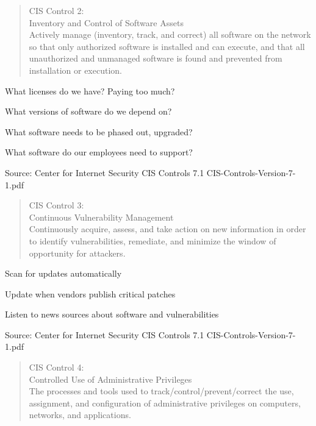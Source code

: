 \documentclass[Screen16to9,17pt]{foils}
\begin{document}

\begin{quote}
CIS Control 2:\\
Inventory and Control of Software Assets\\
Actively manage (inventory, track, and correct) all software on the network so that only authorized software is installed and can execute, and that all unauthorized and unmanaged software is found and prevented from installation or execution.
\end{quote}

\begin{list1}
\item What licenses do we have? Paying too much?
\item What versions of software do we depend on?
\item What software needs to be phased out, upgraded?
\item What software do our employees need to support?
\end{list1}

Source: Center for Internet Security CIS Controls 7.1 CIS-Controls-Version-7-1.pdf



\begin{quote}
CIS Control 3:\\
Continuous Vulnerability Management\\
Continuously acquire, assess, and take action on new information in order to identify vulnerabilities, remediate, and minimize the window of opportunity for attackers.
\end{quote}

\begin{list1}
\item Scan for updates automatically
\item Update when vendors publish critical patches
\item Listen to news sources about software and vulnerabilities
\end{list1}

Source: Center for Internet Security CIS Controls 7.1 CIS-Controls-Version-7-1.pdf



\begin{quote}
CIS Control 4:\\
Controlled Use of Administrative Privileges\\
The processes and tools used to track/control/prevent/correct the use, assignment, and configuration of administrative privileges on computers, networks, and applications.
\end{quote}
\end{document}
